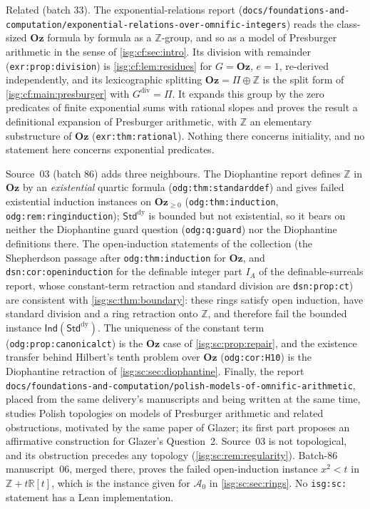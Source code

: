 \documentclass[11pt]{article}
\theoremstyle{definition}
\theoremstyle{remark}
\newcommand{\Oz}{\ensuremath{\mathbf{Oz}}}
\newcommand{\R}{\mathbb{R}}
\newcommand{\Z}{\mathbb{Z}}
\newcommand{\dv}{\mathrm{div}}
\newcommand{\StdDy}{\mathsf{Std}^{\mathrm{dy}}}
\newcommand{\Ind}{\mathsf{Ind}}
\newcommand{\Asc}{\mathcal{A}}
\newcommand{\replabel}[1]{\nolinkurl{#1}}
\begin{document}
Related (batch 33). The exponential-relations report
(\nolinkurl{docs/foundations-and-computation/exponential-relations-over-omnific-integers})
reads the class-sized
$\Oz$ formula by formula as a $\Z$-group, and so as a model of Presburger
arithmetic in the sense of \cref{isg:cf:sec:intro}. Its division with
remainder (\replabel{exr:prop:division}) is \cref{isg:cf:lem:residues} for
$G=\Oz$, $e=1$, re-derived independently, and its lexicographic splitting
$\Oz=\Pi\oplus\Z$ is the split form of \cref{isg:cf:main:presburger} with
$G^{\dv}=\Pi$. It expands this group by the zero predicates of finite
exponential sums with rational slopes and proves the result a definitional
expansion of Presburger arithmetic, with $\Z$ an elementary substructure of
$\Oz$ (\replabel{exr:thm:rational}). Nothing there concerns initiality, and
no statement here concerns exponential predicates.

Source~03 (batch 86) adds three neighbours. The Diophantine report
defines $\Z$ in $\Oz$ by an \emph{existential} quartic formula
(\replabel{odg:thm:standarddef}) and gives failed existential induction
instances on $\Oz_{\ge0}$ (\replabel{odg:thm:induction},
\replabel{odg:rem:ringinduction}); $\StdDy$ is bounded but not
existential, so it bears on neither the Diophantine guard question
(\replabel{odg:q:guard}) nor the Diophantine definitions there. The
open-induction statements of the collection (the Shepherdson passage
after \replabel{odg:thm:induction} for $\Oz$, and
\replabel{dsn:cor:openinduction} for the definable integer part $I_A$ of
the definable-surreals report, whose constant-term retraction and
standard division are \replabel{dsn:prop:ct}) are consistent with
\cref{isg:sc:thm:boundary}: these rings satisfy open induction, have
standard division and a ring retraction onto $\Z$, and therefore fail the
bounded instance $\Ind(\StdDy)$. The uniqueness of the constant term
(\replabel{odg:prop:canonicalct}) is the $\Oz$ case of
\cref{isg:sc:prop:repair}, and the existence transfer behind Hilbert's
tenth problem over $\Oz$ (\replabel{odg:cor:H10}) is the Diophantine
retraction of \cref{isg:sc:sec:diophantine}.
Finally, the report
\nolinkurl{docs/foundations-and-computation/polish-models-of-omnific-arithmetic},
placed from the same delivery's manuscripts and being written at the same
time, studies Polish topologies on models of Presburger arithmetic and
related obstructions, motivated by the same paper of Glazer; its first
part proposes an affirmative construction for Glazer's Question~2.
Source~03 is not topological, and its obstruction precedes any topology
(\cref{isg:sc:rem:regularity}). Batch-86 manuscript~06, merged there,
proves the failed open-induction instance $x^2<t$ in $\Z+t\R[t]$, which
is the instance given for $\Asc_0$ in \cref{isg:sc:sec:rings}. No
\texttt{isg:sc:} statement has a Lean implementation.
\end{document}
